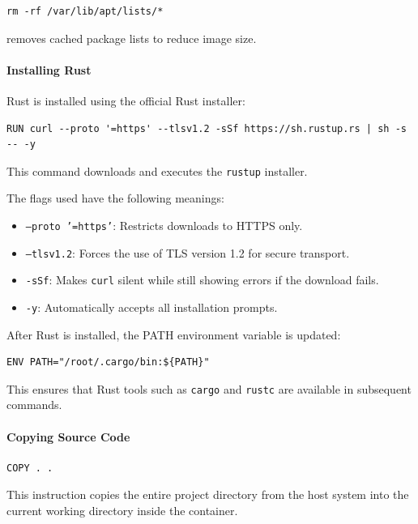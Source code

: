 \documentclass{ieeeaccess}
\begin{document}
\begin{lstlisting}
rm -rf /var/lib/apt/lists/*
\end{lstlisting}

removes cached package lists to reduce image size.

\paragraph{Installing Rust}

Rust is installed using the official Rust installer:

\begin{lstlisting}
RUN curl --proto '=https' --tlsv1.2 -sSf https://sh.rustup.rs | sh -s -- -y
\end{lstlisting}

This command downloads and executes the \texttt{rustup} installer.

The flags used have the following meanings:

\begin{itemize}
    \item \texttt{--proto '=https'}: Restricts downloads to HTTPS only.
    \item \texttt{--tlsv1.2}: Forces the use of TLS version 1.2 for secure transport.
    \item \texttt{-sSf}: Makes \texttt{curl} silent while still showing errors if the download fails.
    \item \texttt{-y}: Automatically accepts all installation prompts.
\end{itemize}

After Rust is installed, the PATH environment variable is updated:

\begin{lstlisting}
ENV PATH="/root/.cargo/bin:${PATH}"
\end{lstlisting}

This ensures that Rust tools such as \texttt{cargo} and \texttt{rustc} are available in subsequent commands.

\paragraph{Copying Source Code}

\begin{lstlisting}
COPY . .
\end{lstlisting}

This instruction copies the entire project directory from the host system into the current working directory inside the container.
\end{document}
